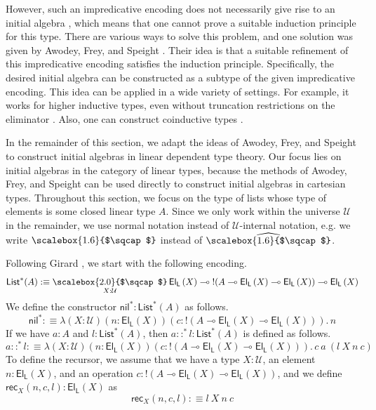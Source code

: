 \documentclass[a4paper,UKenglish,cleveref,numberwithinsect, autoref, thm-restate]{lipics-v2021}
\newcommand{\lin}{\multimap}
\newcommand{\Sqcap}{%
  \mathop{%
    \mathchoice
      {\scalebox{2.0}{$\sqcap$}}%
      {\scalebox{1.6}{$\sqcap$}}%
      {\scalebox{1.2}{$\sqcap$}}%
      {\scalebox{1.0}{$\sqcap$}}%
  }\displaylimits
}
\newcommand{\LPiSym}{\mathop{\Sqcap}}
\newcommand{\LPi}[2]{\LPiSym_{#1} #2}
\newcommand{\Univ}{\mathcal{U}}
\newcommand{\El}{\mathsf{El}}
\newcommand{\ElL}[1]{\El_{\mathsf{L}}\left(#1\right)}
\newcommand{\expL}[1]{\mathbin{!} #1}
\newcommand{\ListI}[1]{\mathsf{List}^*(#1)}
\newcommand{\NilI}{\mathsf{nil}^*}
\newcommand{\ConsSym}{::}
\newcommand{\ConsI}[2]{#1 \ConsSym^* #2}
\newcommand{\Rec}[4]{\mathsf{rec}_{#1}(#2, #3, #4)}
\newcommand{\defeq}{\mathrel{:\equiv}}
\newcommand{\lam}[2]{\lambda{#1}.\,{#2}}
\begin{document}
However,
such an impredicative encoding does not necessarily give rise to an initial algebra \cite{geuvers:2001,rummelhoff:2004},
which means that one cannot prove a suitable induction principle for this type.
There are various ways to solve this problem,
and one solution was given by Awodey, Frey, and Speight \cite{awodey:2018}.
Their idea is that a suitable refinement of this impredicative encoding satisfies the induction principle.
Specifically, the desired initial algebra can be constructed as a subtype of the given impredicative encoding.
This idea can be applied in a wide variety of settings.
For example, it works for higher inductive types, even without truncation restrictions on the eliminator \cite{ripollecheveste:2023}. Also, one can construct coinductive types \cite{bronsveld:2025}.

In the remainder of this section,
we adapt the ideas of Awodey, Frey, and Speight to construct initial algebras in linear dependent type theory.
Our focus lies on initial algebras in the category of linear types,
because the methods of Awodey, Frey, and Speight can be used directly
to construct initial algebras in cartesian types.
Throughout this section,
we focus on the type of lists whose type of elements is some closed linear type $A$.
Since we only work within the universe $\Univ$ in the remainder,
we use normal notation instead of $\Univ$-internal notation,
e.g. we write $\Sqcap$ instead of $\widehat{\Sqcap}$.

Following Girard \cite{girard:1989},
we start with the following encoding.
\[
\ListI{A} \defeq \LPi{X : \Univ}{\ElL{X} \lin \expL{(A \lin \ElL{X} \lin \ElL{X})} \lin \ElL{X}}
\]
We define the constructor $\NilI : \ListI{A}$ as follows.
\[
\NilI \defeq \lam{(X : \Univ) (n : \ElL{X}) (c : \expL{(A \lin \ElL{X} \lin \ElL{X})})}{n}
\]
If we have $a : A$ and $l : \ListI{A}$,
then $\ConsI{a}{l} : \ListI{A}$ is defined as follows.
\[
\ConsI{a}{l} \defeq \lam{(X : \Univ) (n : \ElL{X}) (c : \expL{(A \lin \ElL{X} \lin \ElL{X})})}{c \> a \> (l \> X \> n \> c)}
\]
To define the recursor,
we assume that we have a type $X : \Univ$, an element $n : \ElL{X}$, and an operation $c : \expL{(A \lin \ElL{X} \lin \ElL{X})}$,
and we define $\Rec{X}{n}{c}{l} : \ElL{X}$ as
\[
\Rec{X}{n}{c}{l} \defeq l \> X \> n \> c
\]
\end{document}
